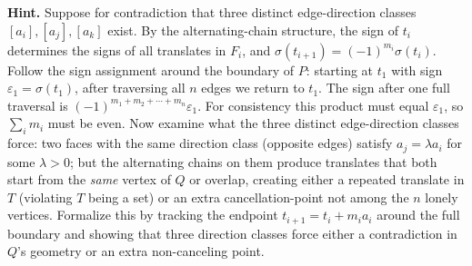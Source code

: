 \documentclass{article}
\begin{document}
\medskip
\textbf{Hint.}
Suppose for contradiction that three distinct edge-direction classes $[a_i],[a_j],[a_k]$
exist.  By the alternating-chain structure, the sign of $t_i$ determines the signs of all
translates in $F_i$, and $\sigma(t_{i+1})=(-1)^{m_i}\sigma(t_i)$.
Follow the sign assignment around the boundary of $P$: starting at $t_1$ with sign
$\varepsilon_1=\sigma(t_1)$, after traversing all $n$ edges we return to $t_1$.
The sign after one full traversal is $(-1)^{m_1+m_2+\cdots+m_n}\varepsilon_1$.
For consistency this product must equal $\varepsilon_1$, so $\sum_i m_i$ must be even.
Now examine what the three distinct edge-direction classes force: two faces with the same
direction class (opposite edges) satisfy $a_j=\lambda a_i$ for some $\lambda>0$; but
the alternating chains on them produce translates that both start from the \emph{same}
vertex of $Q$ or overlap, creating either a repeated translate in $T$ (violating $T$ being
a set) or an extra cancellation-point not among the $n$ lonely vertices.
Formalize this by tracking the endpoint $t_{i+1}=t_i+m_i a_i$ around the full boundary
and showing that three direction classes force either a contradiction in $Q$'s geometry
or an extra non-canceling point.
\end{document}

